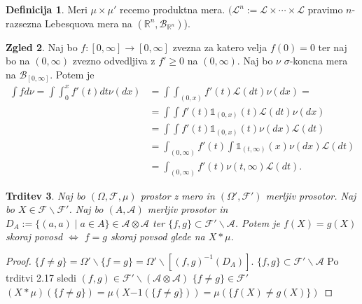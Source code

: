 \documentclass[a4paper,12pt]{article}
\theoremstyle{definition} %
\newtheorem{definicija}{Definicija}[section]
\newtheorem{zgled}[definicija]{Zgled}
\theoremstyle{plain} %
\newtheorem{trditev}[definicija]{Trditev}
\newcommand{\R}{\mathbb{R}}
\newcommand{\F}{\mathcal{F}}
\newcommand{\A}{\mathcal{A}}
\begin{document}
            \begin{definicija}
                Meri $\mu \times \mu'$ recemo produktna mera. $(\mathcal{L}^n:= \mathcal{L}\times \cdots \times\mathcal{L}$ 
                pravimo $n$-razsezna Lebesquova mera na $(\R^n, \mathcal{B}_{\R^n})$). 
            \end{definicija}

            \begin{zgled}
                Naj bo $f:[0, \infty] \rightarrow [0, \infty]$ zvezna za katero velja $f(0) = 0$ ter naj bo na $(0, \infty)$ zvezno odvedljiva z $f'\geq 0$ na $(0, \infty)$. Naj bo $\nu$ $\sigma$-koncna mera na $\mathcal{B}_{[0, \infty]}.$ Potem je 
                \begin{align*}
                    \int f d\nu = \int \int_{0}^x f'(t)dt \nu(dx) &= \int \int_{(0, x)}f'(t)\mathcal{L}(dt)\nu(dx) = \\
                    &=\int \int f'(t)\mathds{1}_{(0, x)}(t)\mathcal{L}(dt)\nu(dx)\\
                    &= \int \int f'(t)\mathds{1}_{(0, x)}(t)\nu(dx)\mathcal{L}(dt) \\
                    &= \int_{(0, \infty)}f'(t)\int \mathds{1}_{(t, \infty)}(x)\nu(dx)\mathcal{L}(dt) \\
                    &= \int_{(0, \infty)}f'(t)\nu(t, \infty)\mathcal{L}(dt).
                \end{align*}
            \end{zgled}

            \begin{trditev}
                Naj bo $(\Omega, \F, \mu)$ prostor z mero in $(\Omega', \F')$ merljiv prosotor. Naj bo $X \in \F\backslash\F'$. 
                Naj bo $(A, \A)$ merljiv prosotor in $D_A:= \{(a, a)\mid a\in A\} \in \A\otimes\A$ ter $\{f, g\}\subset \F'\backslash\A$.
                Potem je $f(X) = g(X)$ skoraj povosd $\iff$ $f = g$ skoraj povsod glede na $X*\mu$.
            \end{trditev}
            
            \begin{proof}
                $\{f \neq g\} = \Omega'\backslash\{f = g\} = \Omega'\backslash\left[(f, g)^{-1}(D_A)\right]$.
                $\{f, g\}\subset \F'\backslash\A$ Po trditvi 2.17 sledi $(f, g) \in \F'\backslash(\A\otimes\A)$
                $\{f \neq g\} \in \F'$
                $(X*\mu)(\{f\neq g\}) = \mu(X{-1}(\{f\neq g\})) = \mu(\{f(X)\neq g(X)\})$
            \end{proof}
\end{document}
